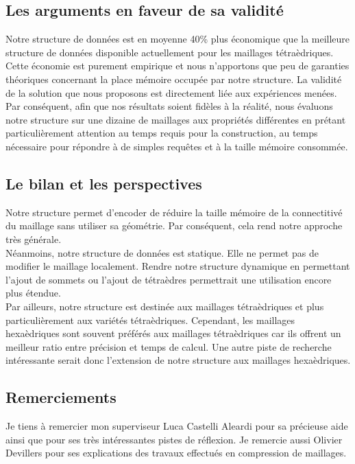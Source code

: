 \subsection*{Les arguments en faveur de sa validité}
\noindent
Notre structure de données est en moyenne 40\% plus économique que la meilleure structure de données disponible actuellement pour les maillages tétraèdriques. Cette économie est purement empirique et nous n'apportons que peu de garanties théoriques concernant la place mémoire occupée par notre structure. La validité de la solution que nous proposons est directement liée aux expériences menées. Par conséquent, afin que nos résultats soient fidèles à la réalité, nous évaluons notre structure sur une dizaine de maillages aux propriétés différentes en prétant particulièrement attention au temps requis pour la construction, au temps nécessaire pour répondre à de simples requêtes et à la taille mémoire consommée.

\subsection*{Le bilan et les perspectives}
\noindent
Notre structure permet d'encoder de réduire la taille mémoire de la connectitivé du maillage sans utiliser sa géométrie. Par conséquent, cela rend notre approche très générale.\\
Néanmoins, notre structure de données est statique. Elle ne permet pas de modifier le maillage localement. Rendre notre structure dynamique en permettant l'ajout de sommets ou l'ajout de tétraèdres permettrait une utilisation encore plus étendue.\\
Par ailleurs, notre structure est destinée aux maillages tétraèdriques et plus particulièrement aux variétés tétraèdriques. Cependant, les maillages hexaèdriques sont souvent préférés aux maillages tétraèdriques car ils offrent un meilleur ratio entre précision et temps de calcul. Une autre piste de recherche intéressante serait donc l'extension de notre structure aux maillages hexaèdriques.

\subsection*{Remerciements}
\noindent
Je tiens à remercier mon superviseur Luca Castelli Aleardi pour sa précieuse aide ainsi que pour ses très intéressantes pistes de réflexion. Je remercie aussi Olivier Devillers pour ses explications des travaux effectués en compression de maillages.

